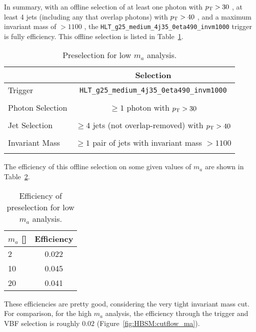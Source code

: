 In summary, with an offline selection of at least one photon with $p_{\text{T}}{}>30$ \GeV{}, at least 4 jets (including any that overlap photons) with $p_{\text{T}}{}>40$ \GeV{}, and a maximum invariant mass of $>1100$ \GeV{}, the \texttt{HLT\_g25\_medium\_4j35\_0eta490\_invm1000} trigger is fully efficiency.
This offline selection is listed in Table~\ref{tab:HBSM_app:new_preselection}.
\begin{table}[htbp]
  \begin{center}
  \caption{Preselection for low $m_a$ analysis.}
  \label{tab:HBSM_app:new_preselection}
    {\footnotesize
  \begin{tabular}{ l c }
    \toprule
    & Selection \\
    \midrule
    Trigger & \texttt{HLT\_g25\_medium\_4j35\_0eta490\_invm1000} \\
    \\
    Photon Selection  & $\geq1$ photon with $p_{\text{T}}{}>30$ \GeV{} \\
    \\ 
    Jet Selection  & $\geq4$ jets (not overlap-removed) with $p_{\text{T}}{}>40$ \GeV{} \\
    \\ 
    Invariant Mass  & $\geq1$ pair of jets with invariant mass $>1100$ \GeV{} \\
    \\ 
    \bottomrule
  \end{tabular}
    }
  \end{center}
\end{table}

The efficiency of this offline selection on some given values of $m_a$ are shown in Table~\ref{tab:HBSM_app:new_preselection_eff}.
\begin{table}[htbp]
  \begin{center}
  \caption{Efficiency of preselection for low $m_a$ analysis.}
  \label{tab:HBSM_app:new_preselection_eff}
    {\footnotesize
  \begin{tabular}{ l c }
    \toprule
    $m_a$ [\GeV{}] & Efficiency \\
    \midrule
    2 & 0.022 \\
    10 & 0.045 \\
    20 & 0.041 \\
    \bottomrule
  \end{tabular}
    }
  \end{center}
\end{table}
These efficiencies are pretty good, considering the very tight invariant mass cut.
For comparison, for the high $m_a$ analysis, the efficiency through the trigger and VBF selection is roughly $0.02$ (Figure~\ref{fig:HBSM:cutflow_ma}).

